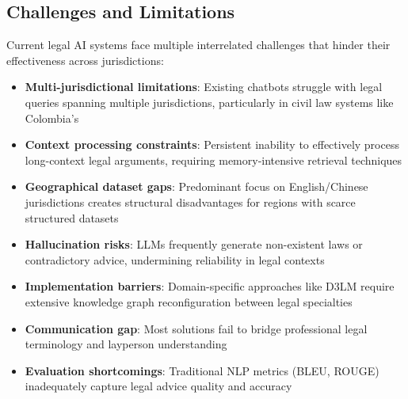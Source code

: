 \subsection{Challenges and Limitations}
Current legal AI systems face multiple interrelated challenges that hinder their 
effectiveness across jurisdictions:
\begin{itemize}
    \item \textbf{Multi-jurisdictional limitations}: Existing chatbots struggle with legal queries spanning multiple jurisdictions, particularly in civil law systems like Colombia's
    
    \item \textbf{Context processing constraints}: Persistent inability to effectively process long-context legal arguments, requiring memory-intensive retrieval techniques
    
    \item \textbf{Geographical dataset gaps}: Predominant focus on English/Chinese jurisdictions creates structural disadvantages for regions with scarce structured datasets
    
    \item \textbf{Hallucination risks}: LLMs frequently generate non-existent laws or contradictory advice, undermining reliability in legal contexts
    
    \item \textbf{Implementation barriers}: Domain-specific approaches like D3LM require extensive knowledge graph reconfiguration between legal specialties
    
    \item \textbf{Communication gap}: Most solutions fail to bridge professional legal terminology and layperson understanding
    
    \item \textbf{Evaluation shortcomings}: Traditional NLP metrics (BLEU, ROUGE) inadequately capture legal advice quality and accuracy
\end{itemize}

